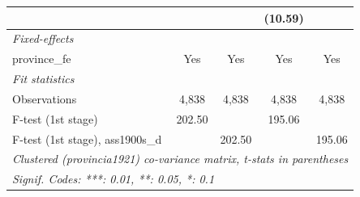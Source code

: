\begin{table}[htbp]
\begin{tabular}{lcccc}
                                       &                       &                             & (10.59)              &   \\   
      \midrule
      \emph{Fixed-effects}\\
      province\_fe                     & Yes                   & Yes                         & Yes                  & Yes\\  
      \midrule
      \emph{Fit statistics}\\
      Observations                     & 4,838                 & 4,838                       & 4,838                & 4,838\\  
      F-test (1st stage)               & 202.50                &                             & 195.06               & \\  
      F-test (1st stage), ass1900s\_d  &                       & 202.50                      &                      & 195.06\\  
      \midrule \midrule
      \multicolumn{5}{l}{\emph{Clustered (provincia1921) co-variance matrix, t-stats in parentheses}}\\
      \multicolumn{5}{l}{\emph{Signif. Codes: ***: 0.01, **: 0.05, *: 0.1}}\\
   \end{tabular}
\end{table}


